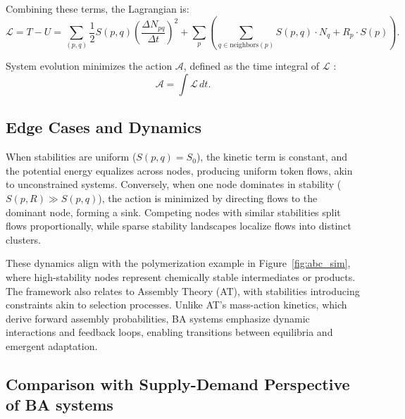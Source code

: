 \documentclass[entropy,article,submit,pdftex,oneauthor]{Definitions/mdpi}
\begin{document}
Combining these terms, the Lagrangian is:
\begin{equation}
\mathcal{L} = T - U = \sum_{(p, q)} \frac{1}{2} S(p, q) \left( \frac{\Delta N_{pq}}{\Delta t} \right)^2 + \sum_{p} \left( \sum_{q \in \text{neighbors}(p)} S(p, q) \cdot N_q + R_p \cdot S(p) \right).
\label{eq:lagrange}
\end{equation}

System evolution minimizes the action \( \mathcal{A} \), defined as the time integral of \( \mathcal{L} \) \cite{goldstein2002classical}:
\begin{equation}
\mathcal{A} = \int \mathcal{L} \, dt.
\label{eq:action}
\end{equation}

\subsection{Edge Cases and Dynamics}
When stabilities are uniform (\( S(p, q) = S_0 \)), the kinetic term is constant, and the potential energy equalizes across nodes, producing uniform token flows, akin to unconstrained systems. Conversely, when one node dominates in stability (\( S(p, R) \gg S(p, q) \)), the action is minimized by directing flows to the dominant node, forming a sink. Competing nodes with similar stabilities split flows proportionally, while sparse stability landscapes localize flows into distinct clusters.

These dynamics align with the polymerization example in Figure~\ref{fig:abc_sim}, where high-stability nodes represent chemically stable intermediates or products. The framework also relates to Assembly Theory (AT), with stabilities introducing constraints akin to selection processes. Unlike AT’s mass-action kinetics, which derive forward assembly probabilities, BA systems emphasize dynamic interactions and feedback loops, enabling transitions between equilibria and emergent adaptation.

\subsection{Comparison with Supply-Demand Perspective of BA systems}
\end{document}
